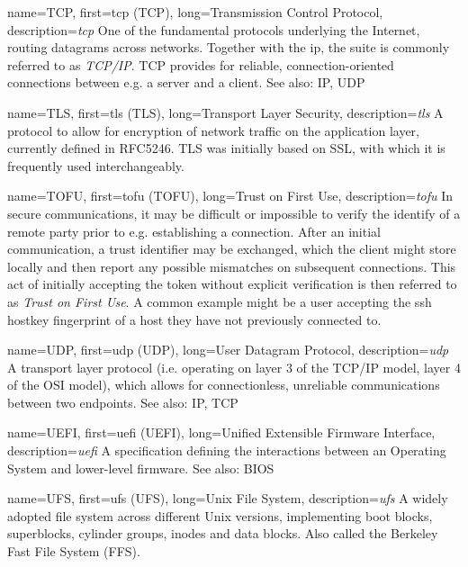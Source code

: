 {
	name={TCP},
	first={\acrlong{tcp} (TCP)},
	long={Transmission Control Protocol},
	description={{\em \acrlong{tcp}} One of the fundamental protocols underlying the
Internet, routing datagrams across networks.  Together
with the \acrlong{ip}, the suite is commonly referred
to as {\em TCP/IP}.  TCP provides for reliable,
connection-oriented connections between e.g. a server
and a client.  See also: IP, UDP}
}

{
	name={TLS},
	first={\acrlong{tls} (TLS)},
	long={Transport Layer Security},
	description={{\em \acrlong{tls}} A protocol to allow for
encryption of network traffic on the application layer, currently defined
in RFC5246.  TLS was initially based on SSL, with which it is frequently
used interchangeably.}
}

{
	name={TOFU},
	first={\acrlong{tofu} (TOFU)},
	long={Trust on First Use},
	description={{\em \acrlong{tofu}} In secure
communications, it may be difficult or impossible to
verify the identify of a remote party prior to e.g.
establishing a connection.  After an initial
communication, a trust identifier may be exchanged,
which the client might store locally and then report
any possible mismatches on subsequent connections.
This act of initially accepting the token without
explicit verification is then referred to as {\em
Trust on First Use}.  A common example might be a user
accepting the ssh hostkey fingerprint of a host they
have not previously connected to.
}
}

{
	name={UDP},
	first={\acrlong{udp} (UDP)},
	long={User Datagram Protocol},
	description={{\em \acrlong{udp}} A transport
layer protocol (i.e. operating on layer 3 of the
TCP/IP model, layer 4 of the OSI model), which allows
for connectionless, unreliable communications between
two endpoints.  See also: IP, TCP}
}

{
	name={UEFI},
	first={\acrlong{uefi} (UEFI)},
	long={Unified Extensible Firmware Interface},
	description={{\em \acrlong{uefi}} A specification
defining the interactions between an Operating System and lower-level
firmware.  See also: BIOS}
}

{
	name={UFS},
	first={\acrlong{ufs} (UFS)},
	long={Unix File System},
	description={{\em \acrlong{ufs}} A widely adopted file system across
different Unix versions, implementing boot blocks, superblocks, cylinder
groups, inodes and data blocks.  Also called the Berkeley Fast File System
(FFS).}
}

